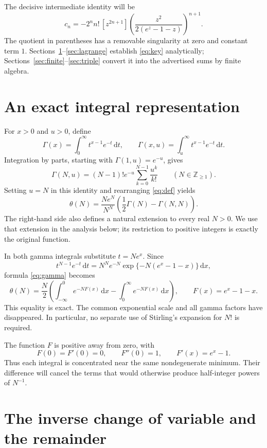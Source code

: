 \documentclass[11pt,letterpaper]{article}
\numberwithin{equation}{section}
\theoremstyle{remark}
\newcommand{\dd}{\,\mathrm{d}}
\begin{document}
The decisive intermediate identity will be
\begin{equation}
 \boxed{\displaystyle
 c_n=-2^n n!\,[z^{2n+1}]
 \left(\frac{z^2}{2(e^z-1-z)}\right)^{n+1}.}
 \label{eq:key}
\end{equation}
The quotient in parentheses has a removable singularity at zero and
constant term $1$. Sections~\ref{sec:integral}--\ref{sec:lagrange} establish
\eqref{eq:key} analytically; Sections~\ref{sec:finite}--\ref{sec:triple}
convert it into the advertised sums by finite algebra.

\section{An exact integral representation}
\label{sec:integral}

For $x>0$ and $u>0$, define
\[
 \Gamma(x)=\int_0^\infty t^{x-1}e^{-t}\dd t,
 \qquad
 \Gamma(x,u)=\int_u^\infty t^{x-1}e^{-t}\dd t.
\]
Integration by parts, starting with $\Gamma(1,u)=e^{-u}$, gives
\[
 \Gamma(N,u)=(N-1)!e^{-u}\sum_{k=0}^{N-1}\frac{u^k}{k!}
 \qquad(N\in\mathbb Z_{\geq1}).
\]
Setting $u=N$ in this identity and rearranging \eqref{eq:def} yields
\begin{equation}
 \theta(N)=\frac{Ne^N}{N^N}
 \left(\frac12\Gamma(N)-\Gamma(N,N)\right).
 \label{eq:gamma}
\end{equation}
The right-hand side also defines a natural extension to every real $N>0$.
We use that extension in the analysis below; its restriction to positive
integers is exactly the original function.

In both gamma integrals substitute $t=Ne^x$. Since
\[
 t^{N-1}e^{-t}\dd t
 =N^Ne^{-N}\exp\{-N(e^x-1-x)\}\dd x,
\]
formula \eqref{eq:gamma} becomes
\begin{equation}
 \theta(N)=\frac N2\left(
   \int_{-\infty}^{0}e^{-NF(x)}\dd x
   -\int_0^\infty e^{-NF(x)}\dd x\right),
 \qquad F(x)=e^x-1-x.
 \label{eq:laplace}
\end{equation}
This equality is exact. The common exponential scale and all gamma factors
have disappeared. In particular, no separate use of Stirling's expansion
for $N!$ is required.

The function $F$ is positive away from zero, with
\[
 F(0)=F'(0)=0,\qquad F''(0)=1,\qquad F'(x)=e^x-1.
\]
Thus each integral is concentrated near the same nondegenerate minimum.
Their difference will cancel the terms that would otherwise produce
half-integer powers of $N^{-1}$.

\section{The inverse change of variable and the remainder}
\label{sec:analytic}
\end{document}
